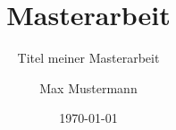 \documentclass{beamer}
\title{Masterarbeit}
\subtitle{Titel meiner Masterarbeit}
\author{Max Mustermann}
\date{\today}
\institute{Hochschule Musterstadt}
\begin{document}
\begin{frame}
	\titlepage
\end{frame}
\end{document}
